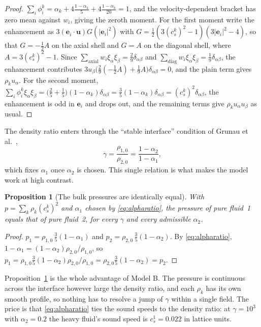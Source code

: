 \documentclass[11pt,a4paper]{article}
\theoremstyle{plain}
\newtheorem{proposition}{Proposition}
\theoremstyle{definition}
\newcommand{\ee}{\mathbf{e}}
\newcommand{\uu}{\mathbf{u}}
\newcommand{\cs}{c_s}
\begin{document}
\begin{proof}
$\sum_i \phi_i^k = \alpha_k + 4\frac{1-\alpha_k}{5}
+ 4\frac{1-\alpha_k}{20} = 1$, and the velocity-dependent bracket has zero mean
against $w_i$, giving the zeroth moment. For the first moment write the
enhancement as $3(\ee_i\!\cdot\!\uu)G(|\ee_i|^2)$ with
$G = \tfrac12(3(\cs^k)^2-1)(3|\ee_i|^2 - 4)$, so that $G = -\tfrac12 A$ on the
axial shell and $G = A$ on the diagonal shell, where $A = 3(\cs^k)^2 - 1$. Since
$\sum_{\text{axial}} w_i \xi_\alpha \xi_\beta = \tfrac29 \delta_{\alpha\beta}$
and $\sum_{\text{diag}} w_i \xi_\alpha\xi_\beta = \tfrac19\delta_{\alpha\beta}$,
the enhancement contributes
$3u_\beta\bigl(\tfrac29(-\tfrac12 A) + \tfrac19 A\bigr)\delta_{\alpha\beta} = 0$,
and the plain term gives $\rho_k u_\alpha$. For the second moment,
$\sum_i \phi_i^k \xi_\alpha\xi_\beta = \bigl(\tfrac{2}{5} + \tfrac15\bigr)
(1-\alpha_k)\delta_{\alpha\beta} = \tfrac35(1-\alpha_k)\delta_{\alpha\beta}
= (\cs^k)^2\delta_{\alpha\beta}$, the enhancement is odd in $\ee_i$ and drops
out, and the remaining terms give $\rho_k u_\alpha u_\beta$ as usual. \qedhere
\end{proof}

The density ratio enters through the ``stable interface'' condition of Grunau et
al.~\cite{grunau1993},
\begin{equation}
  \gamma = \frac{\rho_{1,0}}{\rho_{2,0}} = \frac{1 - \alpha_2}{1 - \alpha_1},
  \label{eq:alpharatio}
\end{equation}
which fixes $\alpha_1$ once $\alpha_2$ is chosen. This single relation is what
makes the model work at high contrast.

\begin{proposition}[The bulk pressures are identically equal]
\label{prop:pressures}
With $p = \sum_k \rho_k (\cs^k)^2$ and $\alpha_1$ chosen by
\eqref{eq:alpharatio}, the pressure of pure fluid~1 equals that of pure
fluid~2, for every $\gamma$ and every admissible $\alpha_2$.
\end{proposition}

\begin{proof}
$p_{1} = \rho_{1,0}\,\tfrac35(1-\alpha_1)$ and
$p_{2} = \rho_{2,0}\,\tfrac35(1-\alpha_2)$. By \eqref{eq:alpharatio},
$1 - \alpha_1 = (1-\alpha_2)\rho_{2,0}/\rho_{1,0}$, so
$p_{1} = \rho_{1,0}\tfrac35 (1-\alpha_2)\rho_{2,0}/\rho_{1,0}
= \rho_{2,0}\tfrac35(1-\alpha_2) = p_{2}$. \qedhere
\end{proof}

Proposition~\ref{prop:pressures} is the whole advantage of Model B. The pressure
is continuous across the interface however large the density ratio, and each
$\rho_k$ has its own smooth profile, so nothing has to resolve a jump of
$\gamma$ within a single field. The price is that \eqref{eq:alpharatio} ties the
sound speeds to the density ratio: at $\gamma = 10^3$ with $\alpha_2 = 0.2$ the
heavy fluid's sound speed is $\cs^1 = 0.022$ in lattice units.
\end{document}
